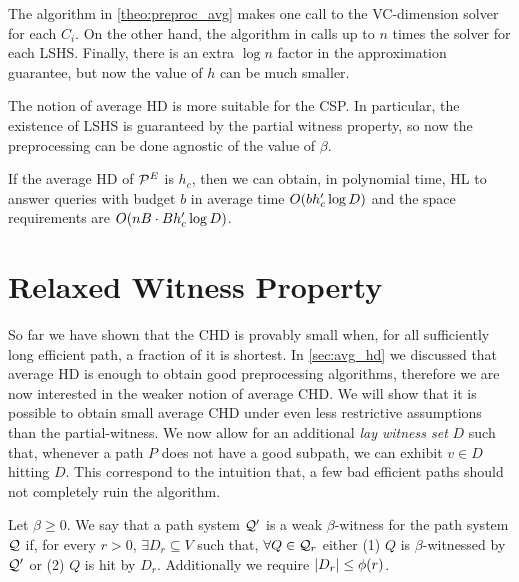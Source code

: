 \documentclass[letterpaper,11pt]{article}
\begin{document}
\begin{remark}
The algorithm in \cref{theo:preproc_avg} makes one call to the VC-dimension solver for each $C_i$.
On the other hand, the algorithm in \cite{highway2013} calls up to $n$ times the solver for each LSHS.
Finally, there is an extra $\log n$ factor in the approximation guarantee, but now the value of $h$ can be much smaller.
\end{remark}

The notion of average HD is more suitable for the CSP.
In particular, the existence of LSHS is guaranteed by the partial witness property, so now the preprocessing can be done agnostic of the value of $\beta$.

\begin{theorem}
If the average HD of $\mathcal{P}^E$ is $h_c$, then we can obtain, in polynomial time, HL to answer queries with budget $b$ in average time $O(bh_c'\log D)$ and the space requirements are $O(nB\cdot Bh_c'\log D)$.
\end{theorem}

\section{Relaxed Witness Property}\label{sec:rel_witness}

So far we have shown that the CHD is provably small when, for all sufficiently long efficient path, a fraction of it is shortest.
In \cref{sec:avg_hd} we discussed that average HD is enough to obtain good preprocessing algorithms, therefore we are now interested in the weaker notion of average CHD.
We will show that it is possible to obtain small average CHD under even less restrictive assumptions than the partial-witness.
We now allow for an additional \emph{lay witness set} $D$ such that, whenever a path $P$ does not have a good subpath, we can exhibit $v\in D$ hitting $D$.
This correspond to the intuition that, a few bad efficient paths should not completely ruin the algorithm. 

\begin{definition}
Let $\beta\geq 0$.
We say that a path system $\mathcal{Q}'$ is a weak $\beta$-witness for the path system $\mathcal{Q}$ if, for every $r>0$, $\exists D_r\subseteq V$ such that, $\forall Q\in \mathcal{Q}_r$ either (1) $Q$ is $\beta$-witnessed by $\mathcal{Q}'$ or (2) $Q$ is hit by $D_r$.
Additionally we require $\lvert D_r\rvert\leq \phi(r)$.
\end{definition} 
\end{document}
